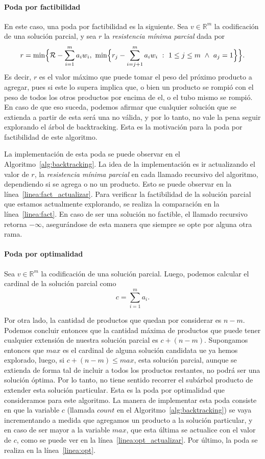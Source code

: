 \documentclass{article}
\DeclarePairedDelimiter\curl{\{}{\}}
\DeclarePairedDelimiter\bigcurl{\Big\{}{\Big\}}
\newcommand{\Rn}[1]{\mathbb{R}^{#1}}
\newcommand{\Res}{\mathcal{R}}
\begin{document}
\paragraph{Poda por factibilidad}
En este caso, una poda por factibilidad es la siguiente. Sea $v\in\Rn{m}$ la codificación de una solución parcial, y sea $r$ la \emph{resistencia mínima parcial} dada por
\[
    r = \min\bigcurl{\Res{} - \sum_{i = 1}^{m}{a_{i}w_{i}},\
        \min\bigcurl{r_{j} - \sum_{i = j + 1}^{m}{a_{i}w_{i}}\ : \ 1 \leq j \leq m \ \wedge \ a_{j} = 1}}.
\]
Es decir, $r$ es el valor máximo que puede tomar el peso del próximo producto a agregar, pues si este lo supera implica que, o bien un producto se rompió con el peso de todos los otros productos por encima de el, o el tubo mismo se rompió. En caso de que eso suceda, podemos afirmar que cualquier solución que se extienda a partir de esta será una no válida, y por lo tanto, no vale la pena seguir explorando el árbol de backtracking. Esta es la motivación para la poda por factibilidad de este algoritmo.

La implementación de esta poda se puede observar en el Algoritmo~\ref{alg:backtracking}. La idea de la implementación es ir actualizando el valor de $r$, la \emph{resistencia mínima parcial} en cada llamado recursivo del algoritmo, dependiendo si se agrega o no un producto. Esto se puede observar en la línea~\ref{linea:fact_actualizar}. Para verificar la factibilidad de la solución parcial que estamos actualmente explorando, se realiza la comparación en la línea~\ref{linea:fact}. En caso de ser una solución no factible, el llamado recursivo retorna $-\infty$, asegurándose de esta manera que siempre se opte por alguna otra rama.

\paragraph{Poda por optimalidad}
Sea $v \in \Rn{m}$ la codificación de una solución parcial. Luego, podemos calcular el cardinal de la solución parcial como
\[
    c = \sum_{i = 1}^{m}{a_{i}}.
\]

Por otra lado, la cantidad de productos que quedan por considerar es $n - m$. Podemos concluir entonces que la cantidad máxima de productos que puede tener cualquier extensión de nuestra solución parcial es $c + (n - m)$. Supongamos entonces que $max$ es el cardinal de alguna solución candidata ue ya hemos explorado, luego, si $c + (n - m) \leq max$, esta solución parcial, aunque se extienda de forma tal de incluir a todos los productos restantes, no podrá ser una solución óptima. Por lo tanto, no tiene sentido recorrer el subárbol producto de extender esta solución particular. Esta es la poda por optimalidad que consideramos para este algoritmo. La manera de implementar esta poda consiste en que la variable $c$ (llamada $count$ en el Algoritmo~\ref{alg:backtracking}) se vaya incrementando a medida que agregamos un producto a la solución particular, y en caso de ser mayor a la variable $max$, que esta última se actualice con el valor de $c$, como se puede ver en la línea~\ref{linea:opt_actualizar}. Por último, la poda se realiza en la línea~\ref{linea:opt}.
\end{document}
